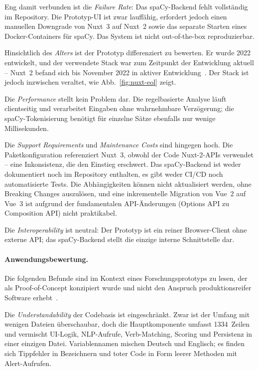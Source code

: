 Eng damit verbunden ist die \emph{Failure Rate}: Das spaCy-Backend fehlt vollständig im Repository.
Die Prototyp-UI ist zwar lauffähig, erfordert jedoch einen manuellen Downgrade von Nuxt~3 auf Nuxt~2 sowie das separate Starten eines Docker-Containers für spaCy.
Das System ist nicht out-of-the-box reproduzierbar.

Hinsichtlich des \emph{Alters} ist der Prototyp differenziert zu bewerten.
Er wurde 2022 entwickelt, und der verwendete Stack war zum Zeitpunkt der Entwicklung aktuell -- Nuxt~2 befand sich bis November 2022 in aktiver Entwicklung~\cite{eol2026nuxt}.
Der Stack ist jedoch inzwischen veraltet, wie Abb.~\ref{fig:nuxt-eol} zeigt.

Die \emph{Performance} stellt kein Problem dar.
Die regelbasierte Analyse läuft clientseitig und verarbeitet Eingaben ohne wahrnehmbare Verzögerung; die spaCy-Tokenisierung benötigt für einzelne Sätze ebenfalls nur wenige Millisekunden.

Die \emph{Support Requirements} und \emph{Maintenance Costs} sind hingegen hoch.
Die Paketkonfiguration referenziert Nuxt~3, obwohl der Code Nuxt-2-APIs verwendet -- eine Inkonsistenz, die den Einstieg erschwert.
Das spaCy-Backend ist weder dokumentiert noch im Repository enthalten, es gibt weder CI/CD noch automatisierte Tests.
Die Abhängigkeiten können nicht aktualisiert werden, ohne Breaking Changes auszulösen, und eine inkrementelle Migration von Vue~2 auf Vue~3 ist aufgrund der fundamentalen API-Änderungen (Options API zu Composition API) nicht praktikabel.

Die \emph{Interoperability} ist neutral: Der Prototyp ist ein reiner Browser-Client ohne externe API; das spaCy-Backend stellt die einzige interne Schnittstelle dar.

\paragraph{Anwendungsbewertung.}

Die folgenden Befunde sind im Kontext eines Forschungsprototyps zu lesen, der als Proof-of-Concept konzipiert wurde und nicht den Anspruch produktionsreifer Software erhebt~\cite{loth2022masterprojekt}.

Die \emph{Understandability} der Codebasis ist eingeschränkt.
Zwar ist der Umfang mit wenigen Dateien überschaubar, doch die Hauptkomponente umfasst 1334~Zeilen und vermischt UI-Logik, NLP-Aufrufe, Verb-Matching, Scoring und Persistenz in einer einzigen Datei.
Variablennamen mischen Deutsch und Englisch; es finden sich Tippfehler in Bezeichnern und toter Code in Form leerer Methoden mit Alert-Aufrufen.

